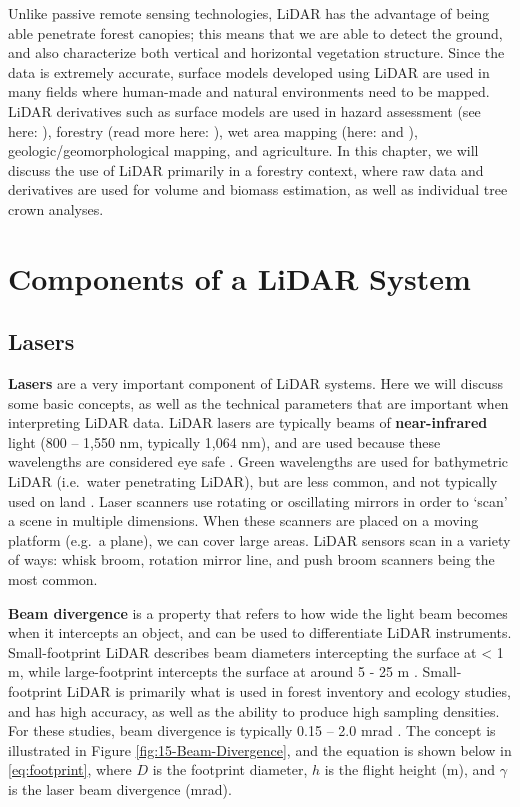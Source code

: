 \documentclass[
]{book}
\begin{document}
Unlike passive remote sensing technologies, LiDAR has the advantage of being able penetrate forest canopies; this means that we are able to detect the ground, and also characterize both vertical and horizontal vegetation structure. Since the data is extremely accurate, surface models developed using LiDAR are used in many fields where human-made and natural environments need to be mapped. LiDAR derivatives such as surface models are used in hazard assessment (see here: \citet{jaboyedoff_use_2012}), forestry (read more here: \citet{goodbody_airborne_2021}), wet area mapping (here: \citet{eash_stream-channel_2018} and \citet{zurqani_evaluating_2020}), geologic/geomorphological mapping, and agriculture. In this chapter, we will discuss the use of LiDAR primarily in a forestry context, where raw data and derivatives are used for volume and biomass estimation, as well as individual tree crown analyses.

\section{Components of a LiDAR System}\label{components-of-a-lidar-system}

\subsection{Lasers}\label{lasers}

\textbf{Lasers} are a very important component of LiDAR systems. Here we will discuss some basic concepts, as well as the technical parameters that are important when interpreting LiDAR data. LiDAR lasers are typically beams of \textbf{near-infrared} light (800 -- 1,550 nm, typically 1,064 nm), and are used because these wavelengths are considered eye safe \citep{white_best_2013}. Green wavelengths are used for bathymetric LiDAR (i.e.~water penetrating LiDAR), but are less common, and not typically used on land \citep{uf_geomatics_-_fort_lauderdale_lidar_2016-2}. Laser scanners use rotating or oscillating mirrors in order to `scan' a scene in multiple dimensions. When these scanners are placed on a moving platform (e.g.~a plane), we can cover large areas. LiDAR sensors scan in a variety of ways: whisk broom, rotation mirror line, and push broom scanners being the most common.

\textbf{Beam divergence} is a property that refers to how wide the light beam becomes when it intercepts an object, and can be used to differentiate LiDAR instruments. Small-footprint LiDAR describes beam diameters intercepting the surface at \textless{} 1 m, while large-footprint intercepts the surface at around 5 - 25 m \citep{lim_lidar_2003}. Small-footprint LiDAR is primarily what is used in forest inventory and ecology studies, and has high accuracy, as well as the ability to produce high sampling densities. For these studies, beam divergence is typically 0.15 -- 2.0 mrad \citep{white_best_2013}. The concept is illustrated in Figure \ref{fig:15-Beam-Divergence}, and the equation is shown below in \eqref{eq:footprint}, where \(D\) is the footprint diameter, \(h\) is the flight height (m), and \(\gamma\) is the laser beam divergence (mrad).
\end{document}
